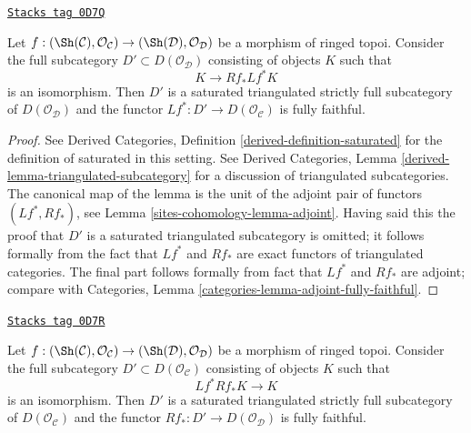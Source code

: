 \begin{lemma}[Downstairs]
\label{sites-cohomology-lemma-downstairs}
\href{https://stacks.math.columbia.edu/tag/0D7Q}{\texttt{Stacks tag 0D7Q}}

Let $f : (\Sh(\mathcal{C}), \mathcal{O}_\mathcal{C}) \to
(\Sh(\mathcal{D}), \mathcal{O}_\mathcal{D})$ be a morphism of ringed topoi.
Consider the full subcategory $D' \subset D(\mathcal{O}_\mathcal{D})$
consisting of objects $K$ such that
$$
K \longrightarrow Rf_*Lf^*K
$$
is an isomorphism. Then $D'$ is a saturated triangulated strictly full
subcategory of $D(\mathcal{O}_\mathcal{D})$ and the functor
$Lf^* : D' \to D(\mathcal{O}_\mathcal{C})$ is fully faithful.
\end{lemma}

\begin{proof}
See Derived Categories, Definition \ref{derived-definition-saturated}
for the definition of saturated in this setting. See
Derived Categories, Lemma \ref{derived-lemma-triangulated-subcategory}
for a discussion of triangulated subcategories.
The canonical map of the lemma is the unit of the adjoint
pair of functors $(Lf^*, Rf_*)$, see Lemma \ref{sites-cohomology-lemma-adjoint}.
Having said this the proof that $D'$ is a saturated triangulated subcategory
is omitted; it follows formally from the fact that
$Lf^*$ and $Rf_*$ are exact functors of triangulated categories.
The final part follows formally from
fact that $Lf^*$ and $Rf_*$ are adjoint; compare with
Categories, Lemma \ref{categories-lemma-adjoint-fully-faithful}.
\end{proof}

\begin{lemma}[Upstairs]
\label{sites-cohomology-lemma-upstairs}
\href{https://stacks.math.columbia.edu/tag/0D7R}{\texttt{Stacks tag 0D7R}}

Let $f : (\Sh(\mathcal{C}), \mathcal{O}_\mathcal{C}) \to
(\Sh(\mathcal{D}), \mathcal{O}_\mathcal{D})$ be a morphism of ringed topoi.
Consider the full subcategory $D' \subset D(\mathcal{O}_\mathcal{C})$
consisting of objects $K$ such that
$$
Lf^*Rf_*K \longrightarrow K
$$
is an isomorphism. Then $D'$ is a saturated triangulated strictly full
subcategory of $D(\mathcal{O}_\mathcal{C})$ and the functor
$Rf_* : D' \to D(\mathcal{O}_\mathcal{D})$ is fully faithful.
\end{lemma}

